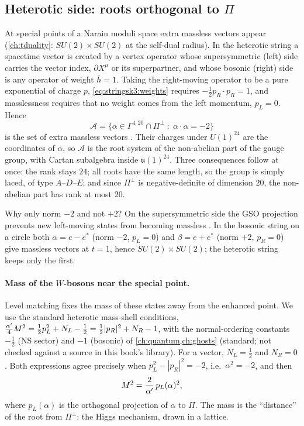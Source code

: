 \subsection{Heterotic side: roots orthogonal to \texorpdfstring{$\Pi$}{Pi}}
At special points of a Narain moduli space extra massless vectors appear
(\cref{ch:tduality}: $SU(2)\times SU(2)$ at the self-dual radius). In the heterotic string a
spacetime vector is created by a vertex operator whose supersymmetric (left) side carries the
vector index, $\partial X^\mu$ or its superpartner, and whose bosonic (right) side is any
operator of weight $\bar h=1$. Taking the right-moving operator to be a pure exponential of
charge $p$, \eqref{eq:stringsk3:weights} requires $-\tfrac12p_R\cdot p_R=1$, and masslessness
requires that no weight comes from the left momentum, $p_L=0$. Hence
\begin{equation}\label{eq:stringsk3:roots}
  \mathcal A=\big\{\alpha\in\Gamma^{4,20}\cap\Pi^\perp\;:\;\alpha\cdot\alpha=-2\big\}
\end{equation}
is the set of extra massless vectors . Their charges
under $U(1)^{24}$ are the coordinates of $\alpha$, so $\mathcal A$ is the root system of the
non-abelian part of the gauge group, with Cartan subalgebra inside $\mathfrak u(1)^{24}$. Three
consequences follow at once: the rank stays $24$; all roots have the same length, so the group
is simply laced, of type $A$--$D$--$E$; and since $\Pi^\perp$ is negative-definite of dimension
$20$, the non-abelian part has rank at most $20$.

Why only norm $-2$ and not $+2$? On the supersymmetric side the GSO projection prevents new
left-moving states from becoming massless . In the bosonic
string on a circle both $\alpha=e-e^*$ (norm $-2$, $p_L=0$) and $\beta=e+e^*$ (norm $+2$,
$p_R=0$) give massless vectors at $t=1$, hence $SU(2)\times SU(2)$; the heterotic string keeps
only the first.

\paragraph{Mass of the $W$-bosons near the special point.} Level matching fixes the mass of
these states away from the enhanced point. We use the standard heterotic mass-shell
conditions, $\tfrac{\alpha'}4M^2=\tfrac12p_L^2+N_L-\tfrac12=\tfrac12|p_R|^2+N_R-1$, with the
normal-ordering constants $-\tfrac12$ (NS sector) and $-1$ (bosonic) of
\cref{ch:quantum,ch:ghosts} (standard; not checked against a source in this book's library).
For a vector, $N_L=\tfrac12$ and $N_R=0$. Both expressions agree precisely when
$p_L^2-|p_R|^2=-2$, i.e.\ $\alpha^2=-2$, and then
\begin{equation}\label{eq:stringsk3:Wmass}
  M^2=\frac{2}{\alpha'}\,p_L(\alpha)^2 ,
\end{equation}
where $p_L(\alpha)$ is the orthogonal projection of $\alpha$ to $\Pi$. The mass is the
``distance'' of the root from $\Pi^\perp$: the Higgs mechanism, drawn in a lattice.

